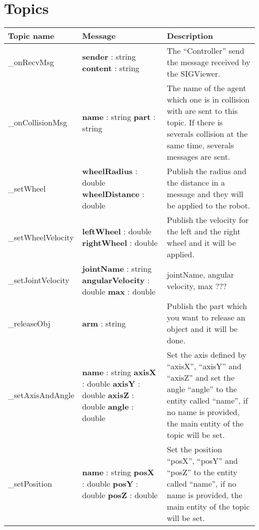 \section{Topics}\label{annex:topics}
\begin{supertabular}{|p{2.9cm}|p{4.5cm}|p{7cm}|}
	\hline
    Topic name & Message & Description \\
  	\hline
  	\_onRecvMsg &
  		\textbf{sender} : string\newline 
  		\textbf{content} : string
  		\medskip & The ``Controller'' send the message received by the SIGViewer.\\
  	\hline
  	\medskip
  	\_onCollisionMsg &
  		\medskip
  		\textbf{name} : string \newline
  		\textbf{part} : string & The name of the agent which one is in collision with are sent to this topic. If there is severals collision at the same time, severals messages are sent.\\
  	\hline
  	\_setWheel & 
  		\textbf{wheelRadius} : double \newline
  		\textbf{wheelDistance} : double & Publish the radius and the distance in a message and they will be applied to the robot.\\
  	\hline
  	\_setWheelVelocity & 
  		\textbf{leftWheel} : double \newline
  		\textbf{rightWheel} : double
  		& Publish the velocity for the left and the right wheel and it will be applied.\\
  	\hline
  	\_setJointVelocity & 
  		\textbf{jointName} : string\newline
  		\textbf{angularVelocity} : double \newline
  		\textbf{max} : double
  		& jointName, angular velocity, max ???\\
  	\hline
  	\_releaseObj & \textbf{arm} : string & Publish the part which you want to release an object and it will be done.\\
  	\hline
  	\_setAxisAndAngle & 
  		\textbf{name} : string \newline
  		\textbf{axisX} : double \newline
  		\textbf{axisY} : double \newline
  		\textbf{axisZ} : double \newline
  		\textbf{angle} : double
  		& Set the axis defined by ``axisX'', ``axisY'' and ``axisZ'' and set the angle ``angle'' to the entity called ``name'', if no name is provided, the main entity of the topic will be set.\\
  	\hline
  	\_setPosition & 
  		\textbf{name} : string \newline
  		\textbf{posX} : double \newline
  		\textbf{posY} : double \newline
  		\textbf{posZ} : double
  		& Set the position ``posX'', ``posY'' and ``posZ'' to the entity called ``name'', if no name is provided, the main entity of the topic will be set.\\
  	\hline
\end{supertabular}

